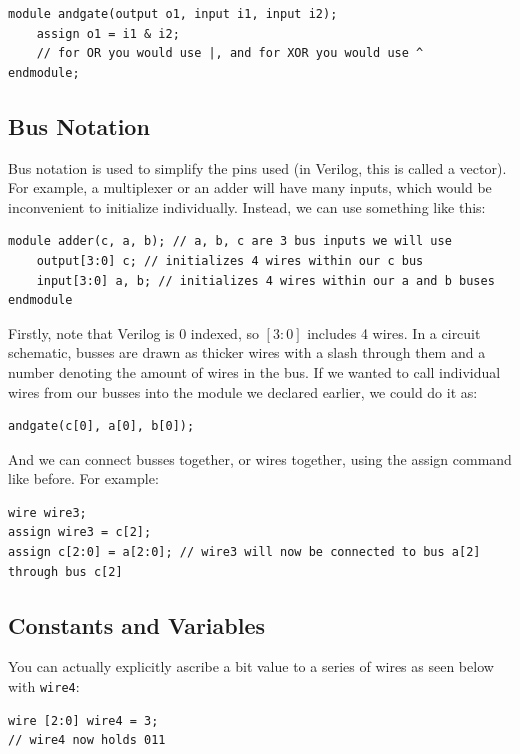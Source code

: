 \bs 
\begin{lstlisting}
module andgate(output o1, input i1, input i2);
    assign o1 = i1 & i2;
    // for OR you would use |, and for XOR you would use ^
endmodule;
\end{lstlisting}
\bs


\subsection{Bus Notation} Bus notation is used to simplify the pins used (in Verilog, this is called a vector). For example, a multiplexer or an adder will have many inputs, which would be inconvenient to initialize individually. Instead, we can use  something like this: 

\bs
\begin{lstlisting}
module adder(c, a, b); // a, b, c are 3 bus inputs we will use
    output[3:0] c; // initializes 4 wires within our c bus
    input[3:0] a, b; // initializes 4 wires within our a and b buses
endmodule
\end{lstlisting}
\bs

Firstly, note that Verilog is 0 indexed, so $[3:0]$ includes 4 wires. In a circuit schematic, busses are drawn as thicker wires with a slash through them and a number denoting the amount of wires in the bus. If we wanted to call individual wires from our busses into the  module we declared earlier, we could do it as: 

\bs 
\begin{lstlisting}
andgate(c[0], a[0], b[0]); 
\end{lstlisting}
\bs

And we can connect busses together, or wires together, using the assign command like before. For example: 

\bs 
\begin{lstlisting}
wire wire3; 
assign wire3 = c[2];
assign c[2:0] = a[2:0]; // wire3 will now be connected to bus a[2] through bus c[2]
\end{lstlisting}
\bs

\subsection{Constants and Variables}

You can actually explicitly ascribe a bit value to a series of wires as seen below with \texttt{wire4}:

\bs 
\begin{lstlisting}
wire [2:0] wire4 = 3;
// wire4 now holds 011
\end{lstlisting}
\bs

